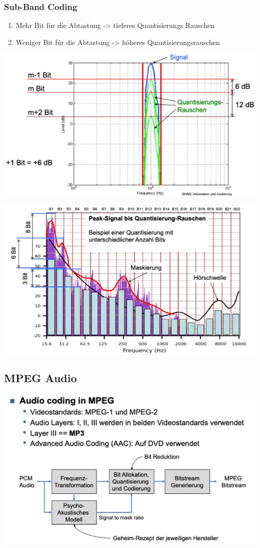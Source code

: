 \subsubsection{Sub-Band Coding}%
\begin{enumerate}
    \item Mehr Bit für die Abtastung -> tieferes Quantisierungs Rauschen
    \item Weniger Bit für die Abtastung -> höheres Quantisierungsrauschen
\end{enumerate}
\begin{center}
    \includegraphics[width=1\linewidth]{images/subband.png}
\end{center}
\begin{center}
    \includegraphics[width=1\linewidth]{images/subband2.png}
\end{center}

\subsection{MPEG Audio}%
\begin{center}
    \includegraphics[width=1\linewidth]{images/mpeg.png}
\end{center}
\vfill

